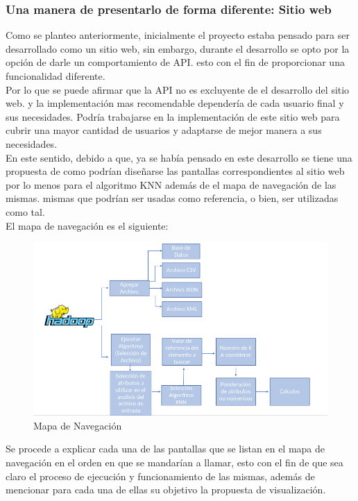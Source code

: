 \subsubsection{Una manera de presentarlo de forma diferente: Sitio web}\label{sitioweb}
Como se planteo anteriormente, inicialmente el proyecto estaba pensado para ser desarrollado como un sitio web, sin embargo, durante el desarrollo se opto por la opción de darle un comportamiento de API. esto con el fin de proporcionar una funcionalidad diferente. \\
Por lo que se puede afirmar que la API no es excluyente de el desarrollo del sitio web. y la implementación mas recomendable dependería de cada usuario final y sus necesidades. Podría trabajarse en la implementación de este sitio web para cubrir una mayor cantidad de usuarios y adaptarse de mejor manera a sus necesidades.\\
En este sentido, debido a que, ya se había pensado en este desarrollo se tiene una propuesta de como podrían diseñarse las pantallas correspondientes al sitio web por lo menos para el algoritmo KNN además de el mapa de navegación de las mismas. mismas que podrían ser usadas como referencia, o bien, ser utilizadas como tal.\\
El mapa de navegación es el siguiente:\\
\begin{figure}[!htbp]
	\hypertarget{fig:red}{\hspace{1pt}}
	\begin{center}
		\includegraphics[width=.9\textwidth]{capitulo7/images/mapadenavegacion.png}
		\caption{Mapa de Navegación}
		\label{fig:mapanav}
	\end{center}
\end{figure}
\newpage
Se procede a explicar cada una de las pantallas que se listan en el mapa de navegación en el orden en que se mandarían a llamar, esto con el fin de que sea claro el proceso de ejecución y funcionamiento de las mismas, además de mencionar para cada una de ellas su objetivo la propuesta de visualización.\\
